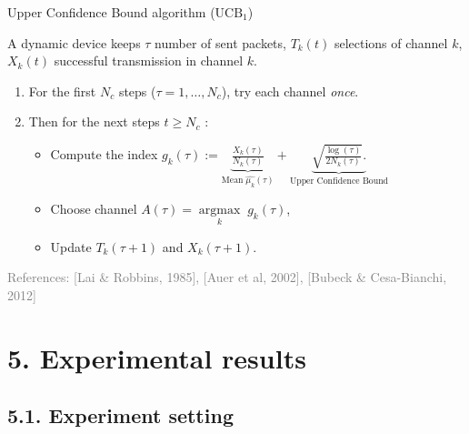 \documentclass[12pt,english,ignorenonframetext,aspectratio=169,]{beamer}
\providecommand{\tightlist}{%
  \setlength{\itemsep}{0pt}\setlength{\parskip}{0pt}}
\begin{document}
\begin{frame}{Upper Confidence Bound algorithm (\(\mathrm{UCB}_1\))}

A dynamic device keeps \(\tau\) number of sent packets, \(T_k(t)\)
selections of channel \(k\), \(X_k(t)\) successful transmission in
channel \(k\).

\begin{enumerate}
\def\labelenumi{\arabic{enumi}.}
\tightlist
\item
  For the first \(N_c\) steps (\(\tau=1,\dots,N_c\)), try each channel
  \emph{once}.
\item
  Then for the next steps \(t \geq N_c\) :

  \begin{itemize}
  \tightlist
  \item
    Compute the index
    \(g_k(\tau) := \underbrace{\frac{X_k(\tau)}{N_k(\tau)}}_{\text{Mean}\; \widehat{\mu_k}(\tau)} + \underbrace{\sqrt{\frac{\log(\tau)}{2 N_k(\tau)}}.}_{\text{Upper Confidence Bound}}\)
  \item
    Choose channel
    \(A(\tau) = \mathop{\arg\max}\limits_{k} \; g_k(\tau)\),
  \item
    Update \(T_k(\tau+1)\) and \(X_k(\tau+1)\).
  \end{itemize}
\end{enumerate}

\vfill{}\hfill{}\tiny{\textcolor{gray}{References: [Lai \& Robbins, 1985], [Auer et al, 2002], [Bubeck \& Cesa-Bianchi, 2012]}}

\end{frame}



\section{\hfill{}5. Experimental results\hfill{}}

\subsection{\hfill{}5.1. Experiment setting\hfill{}}
\end{document}
